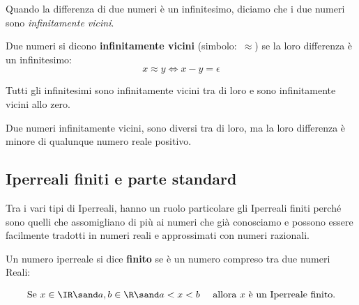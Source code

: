 Quando la differenza di due numeri è un infinitesimo, diciamo 
che i due numeri sono \emph{infinitamente vicini}.

\begin{definizione}    %
Due numeri si dicono \textbf{infinitamente vicini} (simbolo:~$\approx$) se 
la loro differenza è un infinitesimo:
\[x \approx y \Leftrightarrow x - y = \epsilon\]
\end{definizione}

Tutti gli infinitesimi sono infinitamente vicini tra di loro e sono 
infinitamente vicini allo zero.

Due numeri infinitamente vicini, sono diversi tra di loro, ma la loro 
differenza è minore di qualunque numero reale positivo.

\subsection{Iperreali finiti e parte standard}
\label{subsec:insnum_partestandard}

Tra i vari tipi di Iperreali, hanno un ruolo particolare gli Iperreali 
finiti perché sono quelli che assomigliano di più ai numeri che già 
conosciamo e possono essere facilmente tradotti in numeri reali e 
approssimati con numeri razionali. 

\begin{definizione}
 Un numero iperreale si dice \textbf{finito} se è un numero compreso tra 
due numeri Reali:

\[\text{Se } x \in \IR \sand a, b \in \R \sand 
  a < x < b \quad \text{ allora } x \text{ è un Iperreale finito.}\]
\end{definizione}

